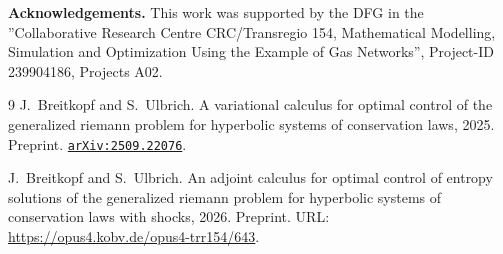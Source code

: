 \documentclass[11pt]{article}
\begin{document}
\noindent
\textbf{Acknowledgements.}
This work was supported by the DFG in the ”Collaborative Research Centre CRC/Transregio 154,
Mathematical Modelling, Simulation and Optimization Using the Example of Gas
Networks”, Project-ID 239904186, Projects A02.


\vspace{1em}

\begin{thebibliography}{9}
J.~Breitkopf and S.~Ulbrich.
\newblock A variational calculus for optimal control of the generalized riemann
  problem for hyperbolic systems of conservation laws, 2025.
\newblock Preprint.
\newblock \href {https://arxiv.org/abs/2509.22076}
  {\nolinkurl{arXiv:2509.22076}}.

J.~Breitkopf and S.~Ulbrich.
\newblock An adjoint calculus for optimal control of entropy solutions of the
  generalized riemann problem for hyperbolic systems of conservation laws with
  shocks, 2026.
\newblock Preprint.
\newblock URL: \url{https://opus4.kobv.de/opus4-trr154/643}.
\end{thebibliography}
\end{document}
